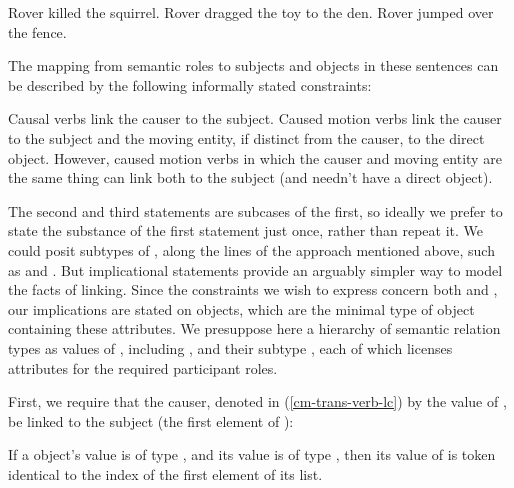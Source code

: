 \documentclass[output=paper
 	        ,biblatex
                ,babelshorthands
                ,newtxmath
                ,draftmode
                ,colorlinks, citecolor=brown
]{langscibook}
\begin{document}
\begin{exe}
\ex \label{link-ex1} Rover killed the squirrel.
\ex \label{link-ex2} Rover dragged the toy to the den.
\ex \label{link-ex3} Rover jumped over the fence.
\end{exe}

\noindent
The mapping from semantic roles to subjects and objects in these sentences can be described by the following informally stated constraints:

\begin{exe}
\ex \begin{xlist}
\ex Causal verbs link the causer to the subject.
\ex Caused motion verbs link the causer to the subject and the moving entity, if distinct from the causer, to the direct object.
\ex However, caused motion verbs in which the causer and moving entity are the same thing can link both to the subject (and needn't have a direct object).
\end{xlist}
\end{exe}

\noindent
The second and third statements are subcases of the first, so ideally we prefer to state the substance of the first statement just once, rather than repeat it.
We could posit subtypes of , along the lines of the approach mentioned above, such as  and .
But implicational statements provide an arguably simpler way to model the facts of linking.
Since the constraints we wish to express concern both  and , our implications are stated on  objects, which are the minimal type of object containing these attributes.
We presuppose here a hierarchy of semantic relation types as values of , including ,  and their subtype , each of which licenses attributes for the required participant roles.

First, we require that the causer, denoted in (\ref{cm-trans-verb-lc}) by the value of , be linked to the subject (the first element of ):

\ealnoraggedright
\ex If a  object's  value is of type , and its  value is of type , then its value of  is token identical to the index of the first element of its  list.
\ex\label{cm-trans-verb-lc}
\zl
\end{document}
